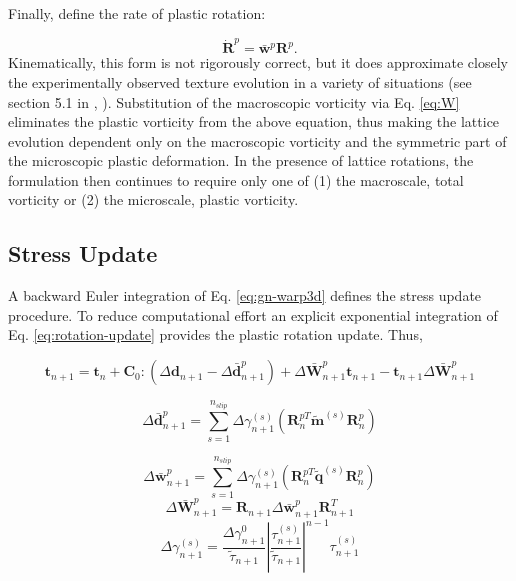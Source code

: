 \documentclass[11pt]{report}
\numberwithin{equation}{section}
\begin{document}
Finally, define the rate of plastic rotation:

\begin{equation}
\dot{\mathbf{R}}^{p}=\bar{\mathbf{w}}^{p}\mathbf{R}^{p}.\label{eq:rotation-update}
\end{equation}
Kinematically, this form is not rigorously correct, but it does approximate
closely the experimentally observed texture evolution in a variety
of situations (see section 5.1 in \cite{HF01}, \cite{KBA92,KBT02,MS01}).
Substitution of the macroscopic vorticity via Eq. \ref{eq:W} eliminates
the plastic vorticity from the above equation, thus making the lattice
evolution dependent only on the macroscopic vorticity and the symmetric
part of the microscopic plastic deformation.
In the presence of lattice
rotations, the formulation then continues to require only one of (1)
the macroscale, total vorticity or (2) the microscale, plastic vorticity.

\subsection{Stress Update}

A backward Euler integration of Eq. \ref{eq:gn-warp3d} defines the
stress update procedure.
To reduce computational effort an explicit
exponential integration of Eq. \ref{eq:rotation-update} provides
the plastic rotation update. Thus,

\begin{equation}
\mathbf{t}_{n+1}=
\mathbf{t}_{n}+\mathbf{C}_{0}:\left(\Delta\mathbf{d}_{n+1}-
\Delta\bar{\mathbf{d}}_{n+1}^{p}\right)+
\Delta\bar{\mathbf{W}}_{n+1}^{p}\mathbf{t}_{n+1}-
\mathbf{t}_{n+1}\Delta\bar{\mathbf{W}}_{n+1}^{p}\label{eq:stress-update-np1}
\end{equation}

\[
\Delta\bar{\mathbf{d}}_{n+1}^{p}=
\sum_{s=1}^{n_{slip}}\Delta\gamma_{n+1}^{\left(s\right)}
\left(\mathbf{R}_{n}^{pT}\tilde{\mathbf{m}}^{\left(s\right)}\mathbf{R}_{n}^{p}\right)
\]


\[
\Delta\bar{\mathbf{w}}_{n+1}^{p}=
\sum_{s=1}^{n_{slip}}\Delta\gamma_{n+1}^{\left(s\right)}
\left(\mathbf{R}_{n}^{pT}\tilde{\mathbf{q}}^{\left(s\right)}\mathbf{R}_{n}^{p}\right)
\]
\[
\Delta\bar{\mathbf{W}}_{n+1}^{p}=
\mathbf{R}_{n+1}\Delta\bar{\mathbf{w}}_{n+1}^{p}\mathbf{R}_{n+1}^{T}
\]
\[
\Delta\gamma_{n+1}^{\left(s\right)}=
\frac{\Delta\gamma_{n+1}^{0}}{\tilde{\tau}_{n+1}}
\left|\frac{\tau_{n+1}^{\left(s\right)}}{\tilde{\tau}_{n+1}}\right|^{n-1}\tau_{n+1}^{\left(s\right)}
\]
\end{document}
